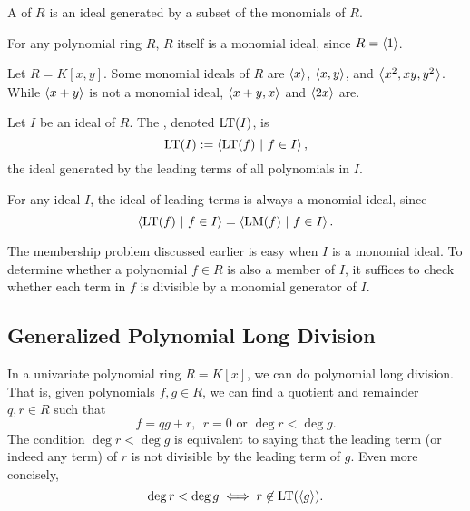 \begin{definition}
  A  of $R$ is an ideal generated by a subset of the monomials of $R$.
\end{definition}
\begin{example}
  For any polynomial ring $R$, $R$ itself is a monomial ideal, since $R = \left\langle 1 \right\rangle$.
\end{example}
\begin{example}
  Let $R = K[x,y]$.
  Some monomial ideals of $R$ are $\left\langle x \right\rangle$, $\left\langle x,y \right\rangle$, and $\left\langle x^2, xy, y^2 \right\rangle$.
  While $\left\langle x + y \right\rangle$ is not a monomial ideal, $\left\langle x + y, x \right\rangle$ and $\left\langle 2x \right\rangle$ are.
\end{example}

\begin{definition}
  Let $I$ be an ideal of $R$.
  The , denoted $\operatorname{LT}(I)$, is
  \begin{equation*}
    \operatorname{LT}(I) := \left\langle  \operatorname{LT}(f) ~|~ f \in I  \right\rangle,
  \end{equation*}
  the ideal generated by the leading terms of all polynomials in $I$.
\end{definition}
For any ideal $I$, the ideal of leading terms is always a monomial ideal, since
\[ \left\langle  \operatorname{LT}(f) ~|~ f \in I  \right\rangle = \left\langle  \operatorname{LM}(f) ~|~ f \in I  \right\rangle. \]

The membership problem discussed earlier is easy when $I$ is a monomial ideal.
To determine whether a polynomial $f \in R$ is also a member of $I$,
it suffices to check whether each term in $f$ is divisible by a monomial generator of $I$.




\subsection{Generalized Polynomial Long Division}

In a univariate polynomial ring $R = K[x]$, we can do polynomial long division.
That is, given polynomials $f, g \in R$, we can find a quotient and remainder $q, r \in R$ such that
\begin{equation*}
  f = qg + r, ~~ r = 0 \text{ or } \deg r < \deg g.
\end{equation*}
The condition $\deg r < \deg g$ is equivalent to saying that the leading term (or indeed any term) of $r$ is not divisible by the leading term of $g$.
Even more concisely, 
\[ \deg r < \deg g \iff r \not\in \operatorname{LT}(\left\langle g \right\rangle). \]


